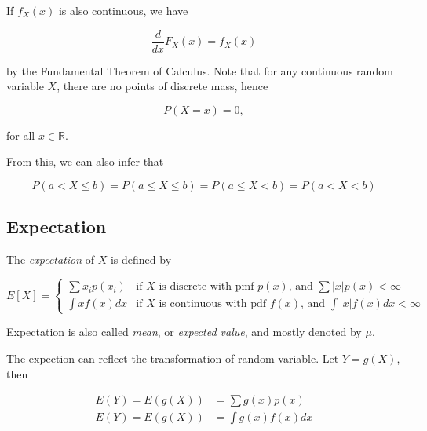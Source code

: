 \documentclass{article}
\begin{document}
            If $ f_{X}(x) $ is also continuous, we have

            \begin{equation*}
                 \frac{d}{dx} F_{X}(x) = f_{X}(x)
            \end{equation*}

            by the Fundamental Theorem of Calculus. Note that for any continuous
            random variable $ X $, there are no points of discrete mass, hence

            \begin{equation*}
                 P(X = x) = 0,
            \end{equation*}

            for all $ x \in \mathbb{R} $.

            From this, we can also infer that

            \begin{equation*}
                 P ( a < X \leq b ) = P ( a \leq X \leq b) = P ( a \leq X < b)
                     = P ( a < X < b)
            \end{equation*}


        \subsection*{Expectation}

            The \textit{expectation} of $ X $ is defined by

            \begin{equation}
                E[X]=\left\{
                    \begin{array}{ll}
                        \sum x_i p(x_{i}) & \text{if } X \text{ is discrete with pmf } p(x) \text{, and }
                            \sum |x| p(x) < \infty \\
                        \int x f(x) dx & \text{if } X \text{ is continuous with pdf } f(x) \text{, and }
                            \int |x| f(x) dx < \infty
                    \end{array}
                \right.
            \end{equation}

            Expectation is also called \textit{mean}, or \textit{expected value},
            and mostly denoted by $ \mu $.

            The expection can reflect the transformation of random variable. Let $ Y = g(X) $, then

            \begin{align*}
                E(Y) = E ( g(X) ) &= \sum g(x) p(x) \\
                E(Y) = E ( g(X) ) &= \int g(x) f(x) dx
            \end{align*}
\end{document}
